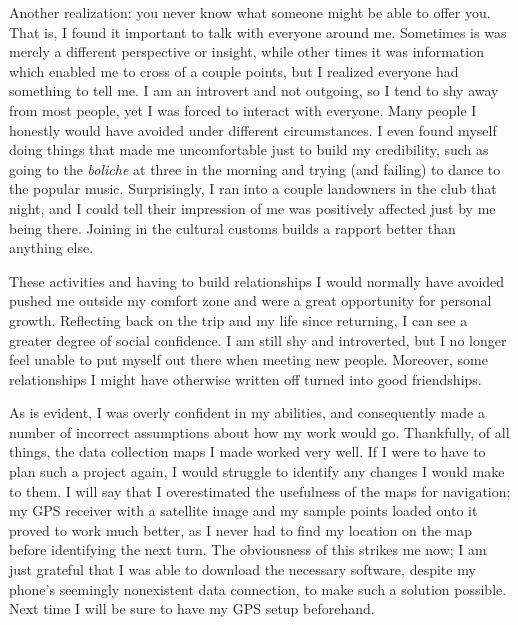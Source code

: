 Another realization: you never know what someone might be able to offer you. That is, I found it important to talk with everyone around me. Sometimes is was merely a different perspective or insight, while other times it was information which enabled me to cross of a couple points, but I realized everyone had something to tell me. I am an introvert and not outgoing, so I tend to shy away from most people, yet I was forced to interact with everyone. Many people I honestly would have avoided under different circumstances. I even found myself doing things that made me uncomfortable just to build my credibility, such as going to the \textit{boliche} at three in the morning and trying (and failing) to dance to the popular music. Surprisingly, I ran into a couple landowners in the club that night, and I could tell their impression of me was positively affected just by me being there. Joining in the cultural customs builds a rapport better than anything else.

These activities and having to build relationships I would normally have avoided pushed me outside my comfort zone and were a great opportunity for personal growth. Reflecting back on the trip and my life since returning, I can see a greater degree of social confidence. I am still shy and introverted, but I no longer feel unable to put myself out there when meeting new people. Moreover, some relationships I might have otherwise written off turned into good friendships.

As is evident, I was overly confident in my abilities, and consequently made a number of incorrect assumptions about how my work would go. Thankfully, of all things, the data collection maps I made worked very well. If I were to have to plan such a project again, I would struggle to identify any changes I would make to them. I will say that I overestimated the usefulness of the maps for navigation; my GPS receiver with a satellite image and my sample points loaded onto it proved to work much better, as I never had to find my location on the map before identifying the next turn. The obviousness of this strikes me now; I am just grateful that I was able to download the necessary software, despite my phone’s seemingly nonexistent data connection, to make such a solution possible. Next time I will be sure to have my GPS setup beforehand.

